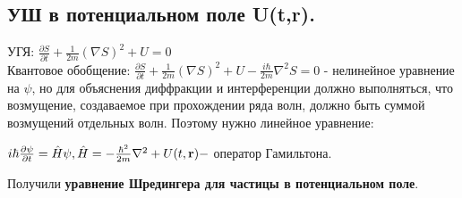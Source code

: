 \subsection*{УШ в потенциальном поле U(t,{\bf r}).}
УГЯ: $\frac{\partial S}{\partial t} + \frac{1}{2m}(\nabla S)^2 + U = 0$\\
Квантовое обобщение: $\frac{\partial S}{\partial t} + \frac{1}{2m}(\nabla S)^2 + U - \frac{i\hbar}{2m}\nabla^2S = 0$ - нелинейное уравнение на $\psi$, но для объяснения диффракции и интерференции должно выполняться, что возмущение, создаваемое при прохождении ряда волн, должно быть суммой возмущений отдельных волн. Поэтому нужно линейное уравнение:
\begin{center}
$i\hbar\frac{\partial \psi}{\partial t} = \hat{H}\psi, \hat{H} =  - \frac{\hbar^2}{2m}\nabla^2 + U(t,{\bf r}) - $ оператор Гамильтона.
\end{center}
Получили {\bf уравнение Шредингера для частицы в потенциальном поле}.












































